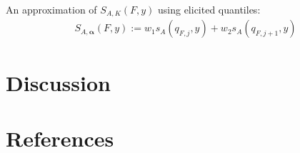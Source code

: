 \documentclass{article}
\begin{document}
An approximation of $S_{A,K}(F,y)$ using elicited quantiles:
\begin{align}
S_{A, \boldsymbol{\alpha}}(F,y) := w_1 s_A(q_{F,j}, y) + w_2 s_A(q_{F,j+1}, y)
\end{align}




\section{Discussion}
\label{sec:discussion}


\section{References}


\end{document}

